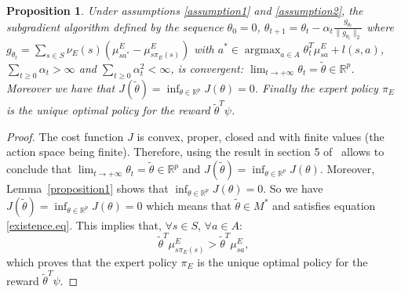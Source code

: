 \documentclass{article}
\newtheorem{prop}{Proposition}
\newcommand{\argmax}{\operatorname*{argmax}} %
\begin{document}
\begin{prop}
Under assumptions \ref{assumption1} and \ref{assumption2}, the
subgradient algorithm defined by the sequence $\theta_0=0$,
$\theta_{t+1}=\theta_t-\alpha_t\frac{g_{\theta_t}}{\|g_{\theta_t}\|_2}$
where $g_{\theta_t}=\sum_{s\in
S}\nu_E(s)(\mu^E_{sa^*}-\mu^E_{s\pi_E(s)})$ with
$a^*\in\argmax_{a\in A}\theta_t^T\mu^E_{sa}+l(s,a)$,
$\sum_{t\geq0}\alpha_t>\infty$ and $\sum_{t\geq0}\alpha_t^2<\infty$,
is convergent:
$\lim_{t\rightarrow+\infty}\theta_t=\tilde{\theta}\in\mathbb{R}^p$.
Moreover we have that
$J(\tilde{\theta})=\inf_{\theta\in\mathbb{R}^p}J(\theta)=0$. Finally
the expert policy $\pi_E$ is the unique optimal policy for the
reward $\tilde{\theta}^T\psi$.
\end{prop}
\begin{proof}
The cost function  $J$ is convex, proper, closed and with finite
values (the action space being finite). Therefore, using the result in section 5 
of~\cite{correa1993convergence} allows to conclude that
$\lim_{t\rightarrow+\infty}\theta_t=\tilde{\theta}\in\mathbb{R}^p$
and $J(\tilde{\theta})=\inf_{\theta\in\mathbb{R}^p}J(\theta)$.
%
Moreover, Lemma~\ref{proposition1} shows that
$\inf_{\theta\in\mathbb{R}^p}J(\theta)=0$.
%
So we have
$J(\tilde{\theta})=\inf_{\theta\in\mathbb{R}^p}J(\theta)=0$ which
means that $\tilde{\theta}\in M^*$ and satisfies equation
\eqref{existence.eq}. This implies that, $\forall s\in S$, $\forall
a\in A$:
\begin{equation}
\tilde{\theta}^T\mu^E_{s\pi_E(s)}>\tilde{\theta}^T\mu^E_{sa},
\end{equation}
which proves that the expert policy $\pi_E$ is the unique optimal
policy for the reward $\tilde{\theta}^T\psi$.
\end{proof}
\end{document}
